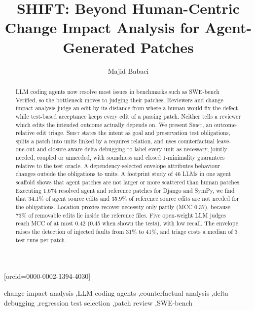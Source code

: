 \documentclass[a4paper,fleqn]{cas-sc}
\newcommand{\tool}{\textsc{Shift}}
\newcommand{\nValidPatches}{1{,}674}
\newcommand{\rqfourCallsMedian}{3}
\newcommand{\rqoneSystems}{46}
\newcommand{\rqthreeSemEnvShort}{41\%}
\newcommand{\rqthreeSemOffShort}{31\%}
\newcommand{\rqtwoAgentSrcUnneeded}{34.1\%}
\newcommand{\rqtwoBestLlmMcc}{0.42}
\newcommand{\rqtwoGoldSrcUnneeded}{35.9\%}
\newcommand{\rqtwoInfMaxMcc}{0.45}
\newcommand{\rqtwoMccPgoldfile}{0.37}
\newcommand{\rqtwoUnneededInGoldShare}{73\%}
\begin{document}
\let\WriteBookmarks\relax
{}
\title[mode=title]{SHIFT: Beyond Human-Centric Change Impact Analysis for Agent-Generated Patches}
\author[1]{Majid Babaei}[orcid=0000-0002-1394-4030]
\cormark[1]

\begin{abstract}
LLM coding agents now resolve most issues in benchmarks such as SWE-bench Verified, so the bottleneck moves to judging their patches. Reviewers and change impact analysis judge an edit by its distance from where a human would fix the defect, while test-based acceptance keeps every edit of a passing patch. Neither tells a reviewer which edits the intended outcome actually depends on. We present \tool{}, an outcome-relative edit triage. \tool{} states the intent as goal and preservation test obligations, splits a patch into units linked by a requires relation, and uses counterfactual leave-one-out and closure-aware delta debugging to label every unit as necessary, jointly needed, coupled or unneeded, with soundness and closed 1-minimality guarantees relative to the test oracle. A dependency-selected envelope attributes behaviour changes outside the obligations to units. A footprint study of \rqoneSystems{} LLMs in one agent scaffold shows that agent patches are not larger or more scattered than human patches. Executing \nValidPatches{} resolved agent and reference patches for Django and SymPy, we find that \rqtwoAgentSrcUnneeded{} of agent source edits and \rqtwoGoldSrcUnneeded{} of reference source edits are not needed for the obligations. Location proxies recover necessity only partly (MCC \rqtwoMccPgoldfile{}), because \rqtwoUnneededInGoldShare{} of removable edits lie inside the reference files. Five open-weight LLM judges reach MCC of at most \rqtwoBestLlmMcc{} (\rqtwoInfMaxMcc{} when shown the tests), with low recall. The envelope raises the detection of injected faults from \rqthreeSemOffShort{} to \rqthreeSemEnvShort{}, and triage costs a median of \rqfourCallsMedian{} test runs per patch.
\end{abstract}

\begin{keywords}
change impact analysis \sep LLM coding agents \sep counterfactual analysis \sep delta debugging \sep regression test selection \sep patch review \sep SWE-bench
\end{keywords}
\maketitle
\raggedbottom
\end{document}
